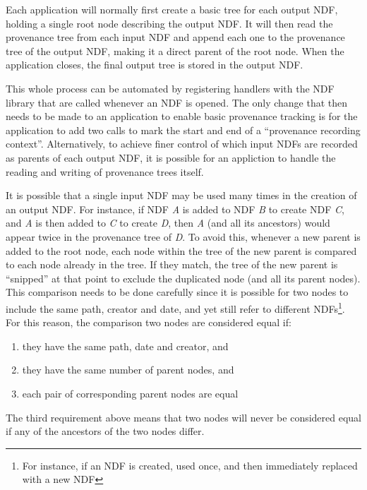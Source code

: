 \documentclass[final,authoryear,5p,times,twocolumn]{elsarticle}
\begin{document}
Each application will normally first create a basic tree for each output
NDF, holding a single root node describing the output NDF. It will then
read the provenance tree from each input NDF and append each one to the
provenance tree of the output NDF, making it a direct parent of the root
node. When the application closes, the final output tree is stored in
the output NDF.

This whole process can be automated by registering handlers with the NDF
library that are called whenever an NDF is opened. The only change that
then needs to be made to an application to enable basic provenance tracking is for the
application to add two calls to mark the start and end of a ``provenance
recording context''. Alternatively, to achieve finer control of which
input NDFs are recorded as parents of each output NDF, it is possible for
an appliction to handle the reading and writing of provenance trees
itself.

It is possible that a single input NDF may be used many times in the
creation of an output NDF. For instance, if NDF \emph{A} is added to NDF
\emph{B} to create NDF \emph{C}, and \emph{A} is then added to \emph{C} to create
\emph{D}, then \emph{A} (and all its ancestors) would appear twice in the
provenance tree of \emph{D}. To avoid this, whenever a new parent is added to
the root node, each node within the tree of the new parent is compared to
each node already in the tree. If they match, the tree of the new parent
is ``snipped'' at that point to exclude the duplicated node (and all its
parent nodes). This comparison needs to be done carefully since it is
possible for two nodes to include the same path, creator and date, and
yet still refer to different NDFs\footnote{For instance, if an NDF is
created, used once, and then immediately replaced with a new NDF}. For
this reason, the comparison two nodes are considered equal if:

\begin{enumerate}
\item they have the same path, date and creator, and
\item they have the same number of parent nodes, and
\item each pair of corresponding parent nodes are equal
\end{enumerate}

The third requirement above means that two nodes will never be considered
equal if any of the ancestors of the two nodes differ.
\end{document}
